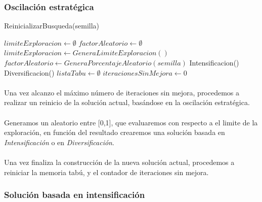 \documentclass{article}
\begin{document}
		\subsubsection{Oscilación estratégica}
		
		\begin{algorithm}[H]
			\caption{ReinicializarBusqueda(semilla)}
			\begin{algorithmic}
				\STATE $limiteExploracion \leftarrow \emptyset$
				\STATE $factorAleatorio \leftarrow \emptyset$
				\STATE $limiteExploracion \leftarrow GeneraLimiteExploracion()$
				\STATE $factorAleatorio \leftarrow GeneraPorcentajeAleatorio(semilla)$
				\STATE Intensificacion()
				\ELSE
				\STATE Diversificacion()
				\ENDIF
				\STATE $listaTabu \leftarrow \emptyset$
				\STATE $iteracionesSinMejora \leftarrow 0$
			\end{algorithmic}
		\end{algorithm}
	
			
		\paragraph{}Una vez alcanzo el máximo número de iteraciones sin mejora, procedemos a realizar un reinicio de la solución actual, basándose en la oscilación estratégica.
		
		\paragraph{}Generamos un aleatorio entre [0,1], que evaluaremos con respecto a el limite de la exploración, en función del resultado crearemos una solución basada en \emph{Intensificación} o en \emph{Diversificación}.
		
		\paragraph{}Una vez finaliza la construcción de la nueva solución actual, procedemos a reiniciar la memoria tabú, y el contador de iteraciones sin mejora.
		
		\subsubsection{Solución basada en intensificación}
		
\end{document}
